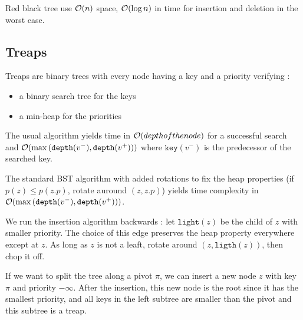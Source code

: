 \documentclass{cours}
\begin{document}
\begin{proposition}[Complexity]
    Red black tree use $\mathcal{O}(n)$ space, $\mathcal{O}(\log n)$ in time for insertion and deletion in the worst case. %
\end{proposition}

\subsection{Treaps}
\begin{definition}
    Treaps are binary trees with every node having a key and a priority verifying :
    \begin{itemize}
        \item a binary search tree for the keys
        \item a min-heap for the priorities
    \end{itemize}
\end{definition}

\begin{proposition}[Search]
    The usual algorithm yields time in $\mathcal{O}(depth of the node)$ for a successful search and $\mathcal{O}(\max \left(\texttt{depth}(v^{-}), \texttt{depth}(v^{+})\right))$ where $\texttt{key}(v^{-})$ is the predecessor of the searched key.
\end{proposition}

\begin{proposition}[Insertion]
    The standard BST algorithm with added rotations to fix the heap properties (if $p(z) \leq p(z.p)$, rotate auround $(z, z.p)$) yields time complexity in $\mathcal{O}(\max\left(\texttt{depth}(v^{-}), \texttt{depth}(v^{+})\right))$.
\end{proposition}

\begin{proposition}[Deletion]
    We run the insertion algorithm backwards : let $\texttt{light}(z)$ be the child of $z$ with smaller priority. The choice of this edge preserves the heap property everywhere except at $z$. As long as $z$ is not a leaft, rotate around $(z, \texttt{ligth}(z))$, then chop it off.
\end{proposition}

\begin{proposition}[Split]
    If we want to split the tree along a pivot $\pi$, we can insert a new node $z$ with key $\pi$ and priority $-\infty$. After the insertion, this new node is the root since it has the smallest priority, and all keys in the left subtree are smaller than the pivot and this subtree is a treap.
\end{proposition}
\end{document}
